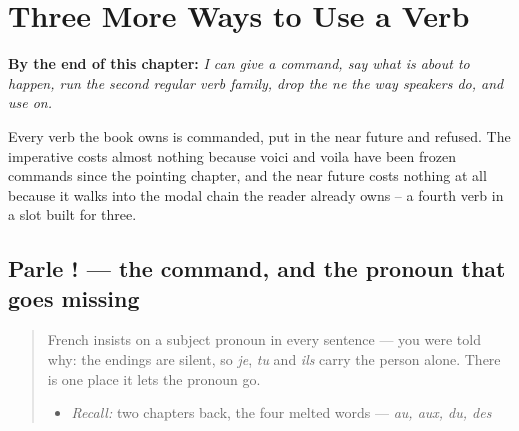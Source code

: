 
\chapter{Three More Ways to Use a Verb}
\label{ch:fr-verb-ways}

\begin{chapteropening}
\textbf{By the end of this chapter:} \emph{I can give a command, say what is about to happen, run the second regular verb family, drop the ne the way speakers do, and use on.}

Every verb the book owns is commanded, put in the near future and refused. The imperative costs almost nothing because voici and voila have been frozen commands since the pointing chapter, and the near future costs nothing at all because it walks into the modal chain the reader already owns -- a fourth verb in a slot built for three.
\end{chapteropening}

\section[Parle ! Écoute !]{Parle ! — the command, and the pronoun that goes missing}

\label{lesson:FR-C37-imperatif}



\begin{quote}
French insists on a subject pronoun in every sentence — you were told why: the endings are silent, so \emph{je}, \emph{tu} and \emph{ils} carry the person alone. There is one place it lets the pronoun go.

\begin{itemize}
\raggedright
  \item \emph{Recall:} two chapters back, the four melted words — \emph{au, aux, du, des}
\end{itemize}
\end{quote}

